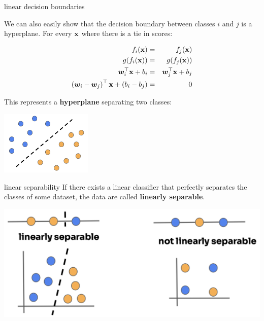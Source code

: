 \documentclass[11pt,compress,t,notes=noshow, xcolor=table]{beamer}
\begin{document}
\begin{vbframe}{linear decision boundaries}
  
We can also easily show that the decision boundary between classes $i$ and $j$ is a hyperplane. For every $\xv$ where there is a tie in scores: 

\begin{eqnarray*}
  \fkx[i] &=& \fkx[j] \\
  g(\fkx[i]) &=& g(\fkx[j]) \\
  \bm{w}_i^\top \xv + b_i &=& \bm{w}_j^\top \xv + b_j \\
  \left(\bm{w}_i - \bm{w}_j\right)^\top \xv + \left(b_i - b_j\right) &=& 0 
\end{eqnarray*}

This represents a \textbf{hyperplane} separating two classes:

\begin{center}
\includegraphics[width=0.33\textwidth]{figure_man/linear_boundary.png} 
\end{center}


\end{vbframe}

\begin{vbframe}{linear separability}
If there exists a linear classifier that perfectly separates the classes of some dataset, the data are called \textbf{linearly separable}.

\vspace{1cm}

\begin{center}
\includegraphics{figure_man/linear_separability-1.png} 
\end{center}

\end{vbframe}
\end{document}
